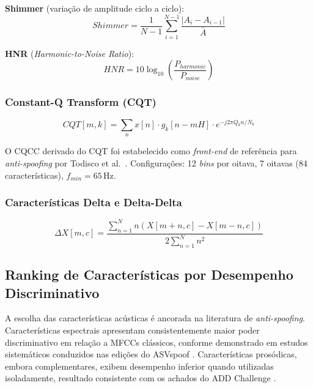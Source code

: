 \documentclass[12pt,a4paper]{article}
\begin{document}
\textbf{Shimmer} (varia\c{c}\~{a}o de amplitude ciclo a ciclo):
\begin{equation}
Shimmer = \frac{1}{N-1}\sum_{i=1}^{N-1}\frac{|A_i - A_{i-1}|}{\bar{A}}
\end{equation}

\textbf{HNR} (\textit{Harmonic-to-Noise Ratio}):
\begin{equation}
HNR = 10\log_{10}\!\left(\frac{P_{harmonic}}{P_{noise}}\right)
\end{equation}

\subsubsection{Constant-Q Transform (CQT)}

\begin{equation}
CQT[m,k] = \sum_{n}x[n]\cdot g_k[n-mH]\cdot e^{-j2\pi Q_k n/N_k}
\end{equation}

O CQCC derivado do CQT foi estabelecido como \textit{front-end} de
refer\^{e}ncia para \textit{anti-spoofing} por Todisco et al.\
\cite{todisco2016new}.
Configura\c{c}\~{o}es: 12 \textit{bins} por oitava, 7 oitavas
(84 caracter\'{i}sticas), $f_{min}=65$\,Hz.

\subsubsection{Caracter\'{i}sticas Delta e Delta-Delta}

\begin{equation}
\Delta X[m,c] = \frac{\displaystyle\sum_{n=1}^{N}n(X[m+n,c]-X[m-n,c])}
                     {2\displaystyle\sum_{n=1}^{N}n^2}
\end{equation}

\subsection{Ranking de Caracter\'{i}sticas por Desempenho Discriminativo}

A escolha das caracter\'{i}sticas ac\'{u}sticas \'{e} ancorada na literatura
de \textit{anti-spoofing}.
Caracter\'{i}sticas espectrais apresentam consistentemente maior poder
discriminativo em rela\c{c}\~{a}o a MFCCs cl\'{a}ssicos, conforme demonstrado
em estudos sistem\'{a}ticos conduzidos nas edi\c{c}\~{o}es do ASVspoof
\cite{sahidullah2015comparison, todisco2016new, todisco2019asvspoof}.
Caracter\'{i}sticas pros\'{o}dicas, embora complementares, exibem desempenho
inferior quando utilizadas isoladamente, resultado consistente com os achados
do ADD Challenge \cite{yi2022add}.
\end{document}
